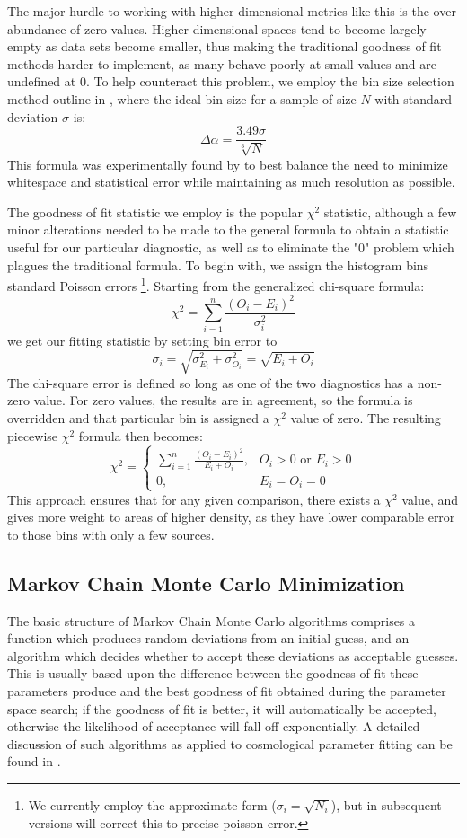 \documentclass[twocolumn,letterpaper,10pt]{article}
\begin{document}
The major hurdle to working with higher dimensional metrics like this is the over abundance of zero values. Higher dimensional spaces tend to become largely empty as data sets become smaller, thus making the traditional goodness of fit methods harder to implement, as many behave poorly at small values and are undefined at 0. To help counteract this problem, we employ the bin size selection method outline in \citet{binsize}, where the ideal bin size for a sample of size $N$ with standard deviation $\sigma$ is: 
$$
\Delta \alpha=\frac{3.49\sigma}{\sqrt[3]{N}}$$
 This formula was experimentally found by \citet{binsize} to best balance the need to minimize whitespace and statistical error while maintaining as much resolution as possible.

The goodness of fit statistic we employ is the popular $\chi^2$ statistic, although a few minor alterations needed to be made to the general formula to obtain a statistic useful for our particular diagnostic, as well as to eliminate the "0" problem which plagues the traditional formula. To begin with, we assign the histogram bins standard Poisson errors \footnote{We currently employ the approximate form ($\sigma_i=\sqrt{N_i}$), but in subsequent versions will correct this to precise poisson error.}. Starting from the generalized chi-square formula:
$$
\chi^2=\sum\limits_{i=1}^n \frac{(O_i-E_i)^2}{\sigma_i^2}
$$
we get our fitting statistic by setting bin error to 
$$
\sigma_i=\sqrt{\sigma_{E_i}^2+\sigma_{O_i}^2}=\sqrt{E_i+O_i}
$$ 
The chi-square error is defined so long as one of the two diagnostics has a non-zero value. For zero values, the results are in agreement, so the formula is overridden and that particular bin is assigned a $\chi^2$ value of zero. The resulting piecewise $\chi^2$ formula then becomes:
$$
\chi^2=
\begin{cases}
\sum\limits_{i=1}^n \frac{(O_i-E_i)^2}{E_i+O_i}, & O_i > 0 \text{ or } E_i > 0 \\
0, & E_i=O_i=0
\end{cases}
$$
This approach ensures that for any given comparison, there exists a $\chi^2$ value, and gives more weight to areas of higher density, as they have lower comparable error to those bins with only a few sources.

\subsection{Markov Chain Monte Carlo Minimization}

The basic structure of Markov Chain Monte Carlo algorithms comprises a function which produces random deviations from an initial guess, and an algorithm which decides whether to accept these deviations as acceptable guesses. This is usually based upon the difference between the goodness of fit these parameters produce and the best goodness of fit obtained during the parameter space search; if the goodness of fit is better, it will automatically be accepted, otherwise the likelihood of acceptance will fall off exponentially. A detailed discussion of such algorithms as applied to cosmological parameter fitting can be found in \citet{dunkley05}.
\end{document}
